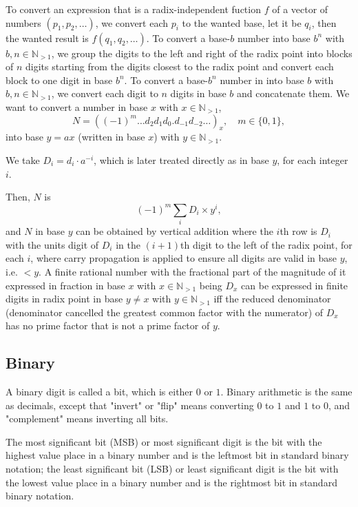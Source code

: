 \documentclass[a4paper,12pt]{report}
\begin{document}
To convert an expression that is a radix-independent fuction $f$ of a vector of numbers $(p_1,p_2,\ldots)$, we convert each $p_i$ to the wanted base, let it be $q_i$, then the wanted result is $f(q_1,q_2,\ldots)$.
To convert a base-$b$ number into base $b^n$ with $b,n\in\mathbb{N}_{>1}$, we group the digits to the left and right of the radix point into blocks of $n$ digits starting from the digits closest to the radix point and convert each block to one digit in base $b^n$.
To convert a base-$b^n$ number in into base $b$ with $b,n\in\mathbb{N}_{>1}$, we convert each digit to $n$ digits in base $b$ and concatenate them.
We want to convert a number in base $x$ with $x\in\mathbb{N}_{>1}$,
\[N=((-1)^m\ldots d_2d_1d_0.d_{-1}d_{-2}\ldots)_x,\quad m\in\{0,1\},\]
into base $y=ax$ (written in base $x$) with $y\in\mathbb{N}_{>1}$.

We take $D_i=d_i\cdot a^{-i}$, which is later treated directly as in base $y$, for each integer $i$.

Then, $N$ is
\[(-1)^m\sum_iD_i\times y^i,\]
and $N$ in base $y$ can be obtained by vertical addition where the $i$th row is $D_i$ with the units digit of $D_i$ in the $(i+1)$th digit to the left of the radix point, for each $i$, where carry propagation is applied to ensure all digits are valid in base $y$, i.e. $<y$.
A finite rational number with the fractional part of the magnitude of it expressed in fraction in base $x$ with $x\in\mathbb{N}_{>1}$ being $D_x$ can be expressed in finite digits in radix point in base $y\neq x$ with $y\in\mathbb{N}_{>1}$ iff the reduced denominator (denominator cancelled the greatest common factor with the numerator) of $D_x$ has no prime factor that is not a prime factor of $y$.
\subsection{Binary}
A binary digit is called a bit, which is either $0$ or $1$. Binary arithmetic is the same as decimals, except that "invert" or "flip" means converting $0$ to $1$ and $1$ to $0$, and "complement" means inverting all bits.

The most significant bit (MSB) or most significant digit is the bit with the highest value place in a binary number and is the leftmost bit in standard binary notation; the least significant bit (LSB) or least significant digit is the bit with the lowest value place in a binary number and is the rightmost bit in standard binary notation.
\end{document}
